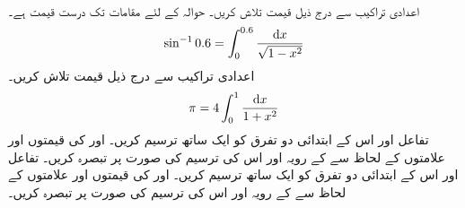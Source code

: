\\
اعدادی تراکیب سے درج ذیل قیمت تلاش کریں۔ حوالہ کے لئے  مقامات تک درست قیمت  ہے۔
\begin{align*}
\sin^{-1}0.6=\int_{0}^{0.6}\frac{\dif x}{\sqrt{1-x^2}}
\end{align*}
اعدادی تراکیب سے درج ذیل قیمت تلاش کریں۔
\begin{align*}
\pi=4\int_0^1\frac{\dif x}{1+x^2}
\end{align*}
تفاعل  اور اس کے ابتدائی دو تفرق کو ایک ساتھ ترسیم کریں۔   اور  کی قیمتوں اور علامتوں کے لحاظ سے  کے رویہ اور اس کی ترسیم کی صورت  پر تبصرہ کریں۔
تفاعل  اور اس کے ابتدائی دو تفرق کو ایک ساتھ ترسیم کریں۔   اور  کی قیمتوں اور علامتوں کے لحاظ سے  کے رویہ اور اس کی ترسیم کی صورت  پر تبصرہ کریں۔
